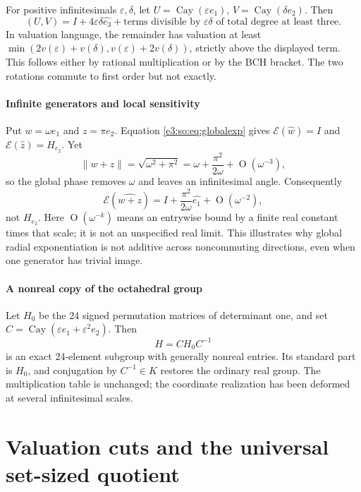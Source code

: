 \documentclass[11pt,letterpaper]{article}
\numberwithin{equation}{section}
\theoremstyle{definition}
\theoremstyle{remark}
\newcommand{\eps}{\varepsilon}
\newcommand{\cay}{\operatorname{Cay}}
\newcommand{\norm}[1]{\left\lVert#1\right\rVert}
\newcommand{\smallO}{\operatorname{O}}
\newcommand{\comm}[2]{\left(#1,#2\right)}
\begin{document}
For positive infinitesimals \(\eps,\delta\), let
\(U=\cay(\eps e_1)\), \(V=\cay(\delta e_2)\). Then
\begin{equation}\label{e3:so:eq:twoscale}
 \comm{U}{V}=I+4\eps\delta\widehat{e_3}
       +\text{terms divisible by }\eps\delta
          \text{ of total degree at least three}.
\end{equation}
In valuation language, the remainder has valuation at least
\(\min(2v(\eps)+v(\delta),v(\eps)+2v(\delta))\), strictly above the displayed
term. This follows either by rational multiplication or by the BCH bracket.
The two rotations commute to first order but not exactly.

\subsection{Infinite generators and local sensitivity}

Put \(w=\omega e_1\) and \(z=\pi e_2\). Equation \cref{e3:so:eq:globalexp} gives
\(\mathcal E(\widehat w)=I\) and \(\mathcal E(\widehat z)=H_{e_2}\). Yet
\[
 \norm{w+z}=\sqrt{\omega^2+\pi^2}
 =\omega+\frac{\pi^2}{2\omega}+\smallO(\omega^{-3}),
\]
so the global phase removes \(\omega\) and leaves an infinitesimal angle.
Consequently
\[
 \mathcal E(\widehat{w+z})=I+\frac{\pi^2}{2\omega}\widehat{e_1}
                        +\smallO(\omega^{-2}),
\]
not \(H_{e_2}\). Here \(\smallO(\omega^{-k})\) means an entrywise bound by a
finite real constant times that scale; it is not an unspecified real limit.
This illustrates why global radial exponentiation is not additive across
noncommuting directions, even when one generator has trivial image.

\subsection{A nonreal copy of the octahedral group}

Let \(H_0\) be the 24 signed permutation matrices of determinant one, and set
\(C=\cay(\eps e_1+\eps^2e_2)\). Then
\[
 H=CH_0C^{-1}
\]
is an exact 24-element subgroup with generally nonreal entries. Its standard
part is \(H_0\), and conjugation by \(C^{-1}\in K\) restores the ordinary
real group. The multiplication table is unchanged; the coordinate realization
has been deformed at several infinitesimal scales.

\part{Valuation cuts and the universal set-sized quotient}\label{e3:cut:part}
\end{document}
